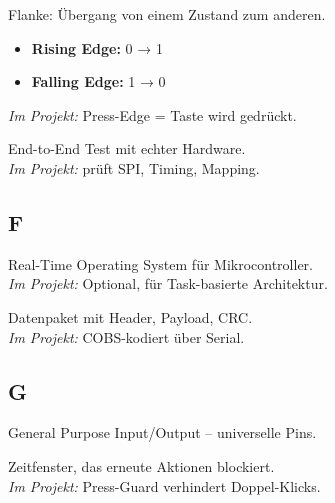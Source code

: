 \begin{description}[style=nextline, leftmargin=2.5cm, labelwidth=2.3cm]

\item[Edge]
Flanke: Übergang von einem Zustand zum anderen.
\begin{itemize}[nosep, leftmargin=1.5em]
\item \textbf{Rising Edge:} 0 → 1
\item \textbf{Falling Edge:} 1 → 0
\end{itemize}
\textit{Im Projekt:} Press-Edge = Taste wird gedrückt.

\item[E2E-Test]
End-to-End Test mit echter Hardware.\\
\textit{Im Projekt:}  prüft SPI, Timing, Mapping.

\end{description}

\subsection*{F}

\begin{description}[style=nextline, leftmargin=2.5cm, labelwidth=2.3cm]

\item[FreeRTOS]
Real-Time Operating System für Mikrocontroller.\\
\textit{Im Projekt:} Optional, für Task-basierte Architektur.

\item[Frame]
Datenpaket mit Header, Payload, CRC.\\
\textit{Im Projekt:} COBS-kodiert über Serial.

\end{description}

\subsection*{G}

\begin{description}[style=nextline, leftmargin=2.5cm, labelwidth=2.3cm]

\item[GPIO]
General Purpose Input/Output – universelle Pins.

\item[Guard]
Zeitfenster, das erneute Aktionen blockiert.\\
\textit{Im Projekt:} Press-Guard verhindert Doppel-Klicks.

\end{description}

